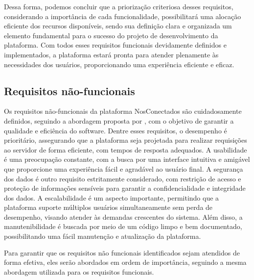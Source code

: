 \documentclass[tcc,capa]{texufpel}
\begin{document}
Dessa forma, podemos concluir que a priorização criteriosa desses requisitos, considerando a importância de cada funcionalidade, possibilitará uma alocação eficiente dos recursos disponíveis, sendo sua definição clara e organizada um elemento fundamental para o sucesso do projeto de desenvolvimento da plataforma. Com todos esses requisitos funcionais devidamente definidos e implementados, a plataforma estará pronta para atender plenamente às necessidades dos usuários, proporcionando uma experiência eficiente e eficaz.

\subsection{Requisitos não-funcionais}
Os requisitos não-funcionais da plataforma NosConectados são cuidadosamente definidos, seguindo a abordagem proposta por \citet{book:chung:2000}, com o objetivo de garantir a qualidade e eficiência do software. Dentre esses requisitos, o desempenho é prioritário, assegurando que a plataforma seja projetada para realizar requisições ao servidor de forma eficiente, com tempos de resposta adequados. A usabilidade é uma preocupação constante, com a busca por uma interface intuitiva e amigável que proporcione uma experiência fácil e agradável ao usuário final. A segurança dos dados é outro requisito estritamente considerado, com restrição de acesso e proteção de informações sensíveis para garantir a confidencialidade e integridade dos dados. A escalabilidade é um aspecto importante, permitindo que a plataforma suporte múltiplos usuários simultaneamente sem perda de desempenho, visando atender às demandas crescentes do sistema. Além disso, a manutenibilidade é buscada por meio de um código limpo e bem documentado, possibilitando uma fácil manutenção e atualização da plataforma.

Para garantir que os requisitos não funcionais identificados sejam atendidos de forma efetiva, eles serão abordados em ordem de importância, seguindo a mesma abordagem utilizada para os requisitos funcionais.
\end{document}
